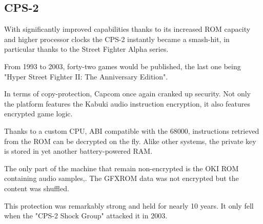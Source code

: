 \subsection{CPS-2}

With significantly improved capabilities thanks to its increased ROM capacity and higher processor clocks the CPS-2 instantly became a smash-hit, in particular thanks to the Street Fighter Alpha series. 

From 1993 to 2003, forty-two games would be published, the last one being "Hyper Street Fighter II: The Anniversary Edition".

In terms of copy-protection, Capcom once again cranked up security. Not only the platform features the Kabuki audio instruction encryption, it also features encrypted game logic. 

Thanks to a custom CPU, ABI compatible with the 68000, instructions retrieved from the ROM can be decrypted on the fly. Alike other systems, the private key is stored in yet another battery-powered RAM.

The only part of the machine that remain non-encrypted is the OKI ROM containing audio samples,. The GFXROM data was not encrypted but the content was shuffled.

\begin{trivia}
This protection was remarkably strong and held for nearly 10 years. It only fell when the "CPS-2 Shock Group" attacked it in 2003\cite{cps2rebirth}.
\end{trivia}



